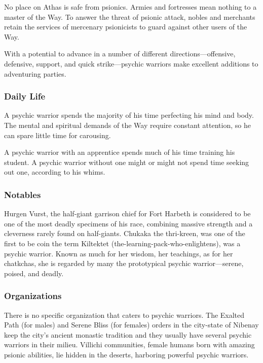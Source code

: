 No place on Athas is safe from psionics. Armies and fortresses mean nothing to a master of the Way. To answer the threat of psionic attack, nobles and merchants retain the services of mercenary psionicists to guard against other users of the Way.

With a potential to advance in a number of different directions---offensive, defensive, support, and quick strike---psychic warriors make excellent additions to adventuring parties.

\subsubsection{Daily Life}

A psychic warrior spends the majority of his time perfecting his mind and body. The mental and spiritual demands of the Way require constant attention, so he can spare little time for carousing.

A psychic warrior with an apprentice spends much of his time training his student. A psychic warrior without one might or might not spend time seeking out one, according to his whims.

\subsubsection{Notables}

Hurgen Vurst, the half-giant garrison chief for Fort Harbeth is considered to be one of the most deadly specimens of his race, combining massive strength and a cleverness rarely found on half-giants. Chukaka the thri-kreen, was one of the first to be coin the term Kiltektet (the-learning-pack-who-enlightens), was a psychic warrior. Known as much for her wisdom, her teachings, as for her chatkchas, she is regarded by many the prototypical psychic warrior---serene, poised, and deadly.

\subsubsection{Organizations}

There is no specific organization that caters to psychic warriors. The Exalted Path (for males) and Serene Bliss (for females) orders in the city-state of Nibenay keep the city's ancient monastic tradition and they usually have several psychic warriors in their milieu. Villichi communities, female humans born with amazing psionic abilities, lie hidden in the deserts, harboring powerful psychic warriors.

